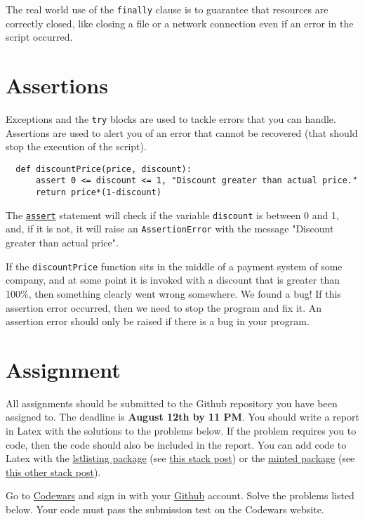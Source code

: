 \documentclass[12pt, a4paper]{article}
\begin{document}
The real world use of the \texttt{finally} clause is to guarantee that resources are correctly closed, like closing a file or a network connection even if an error in the script occurred.
\section{Assertions}
\label{sec:orgda998f2}
Exceptions and the \texttt{try} blocks are used to tackle errors that you can handle.
Assertions are used to alert you of an error that cannot be recovered (that should stop the execution of the script).
\lstset{language=Python,label= ,caption= ,captionpos=b,numbers=none}
\begin{lstlisting}
  def discountPrice(price, discount):
      assert 0 <= discount <= 1, "Discount greater than actual price."
      return price*(1-discount)
\end{lstlisting}
The \href{https://docs.python.org/3.6/reference/simple\_stmts.html\#the-assert-statement}{\texttt{assert}} statement will check if the variable \texttt{discount} is between 0 and 1, and, if it is not, it will raise an \texttt{AssertionError} with the message "Discount greater than actual price".

If the \texttt{discountPrice} function sits in the middle of a payment system of some company, and at some point it is invoked with a discount that is greater than 100\%, then something clearly went wrong somewhere.
We found a bug!
If this assertion error occurred, then we need to stop the program and fix it.
An assertion error should only be raised if there is a bug in your program.
\section{Assignment}
\label{sec:org4065272}
All assignments should be submitted to the Github repository you have been assigned to.
The deadline is \textbf{August 12th by 11 PM}.
You should write a report in Latex with the solutions to the problems below.
If the problem requires you to code, then the code should also be included in the report.
You can add code to Latex with the \href{http://texdoc.net/texmf-dist/doc/latex/listings/listings.pdf}{lstlisting package} (see \href{https://tex.stackexchange.com/a/83883/65818}{this stack post}) or the \href{http://tug.ctan.org/tex-archive/macros/latex/contrib/minted/minted.pdf}{minted package} (see \href{https://stackoverflow.com/a/1985330/1445572}{this other stack post}).

Go to \href{https://www.codewars.com/users/sign\_in}{Codewars} and sign in with your \href{https://github.com}{Github} account.
Solve the problems listed below.
Your code must pass the submission test on the Codewars website.
\end{document}
